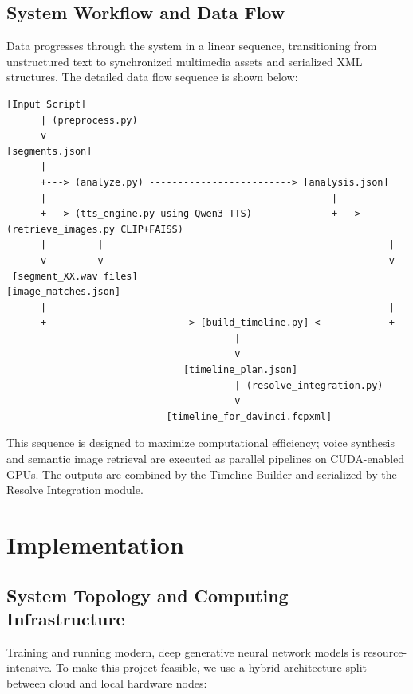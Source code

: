 \documentclass[a4paper,12pt]{report}
\begin{document}
\section{System Workflow and Data Flow}
Data progresses through the system in a linear sequence, transitioning from unstructured text to synchronized multimedia assets and serialized XML structures. The detailed data flow sequence is shown below:

\begin{verbatim}
[Input Script] 
      | (preprocess.py)
      v
[segments.json]
      |
      +---> (analyze.py) -------------------------> [analysis.json]
      |                                                  |
      +---> (tts_engine.py using Qwen3-TTS)              +---> (retrieve_images.py CLIP+FAISS)
      |         |                                                  |
      v         v                                                  v
 [segment_XX.wav files]                                    [image_matches.json]
      |                                                            |
      +-------------------------> [build_timeline.py] <------------+
                                        |
                                        v
                               [timeline_plan.json]
                                        | (resolve_integration.py)
                                        v
                            [timeline_for_davinci.fcpxml]
\end{verbatim}

This sequence is designed to maximize computational efficiency; voice synthesis and semantic image retrieval are executed as parallel pipelines on CUDA-enabled GPUs. The outputs are combined by the Timeline Builder and serialized by the Resolve Integration module.

\newpage

\chapter{Implementation}
\label{ch:implementation}

\section{System Topology and Computing Infrastructure}
Training and running modern, deep generative neural network models is resource-intensive. To make this project feasible, we use a hybrid architecture split between cloud and local hardware nodes:
\end{document}
